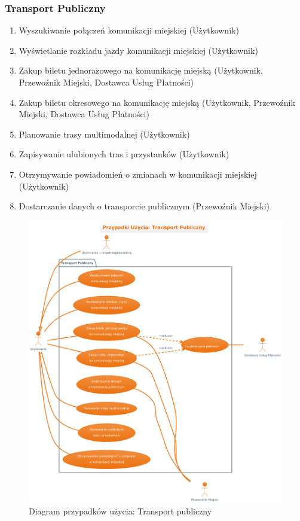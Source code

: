 \documentclass[a4paper,12pt]{article}
\begin{document}
\subsubsection{Transport Publiczny}
\begin{enumerate}[label=\arabic*.]
    \item Wyszukiwanie połączeń komunikacji miejskiej (Użytkownik)
    \item Wyświetlanie rozkładu jazdy komunikacji miejskiej (Użytkownik)
    \item Zakup biletu jednorazowego na komunikację miejską (Użytkownik, Przewoźnik Miejski, Dostawca Usług Płatności)
    \item Zakup biletu okresowego na komunikację miejską (Użytkownik, Przewoźnik Miejski, Dostawca Usług Płatności)
    \item Planowanie trasy multimodalnej (Użytkownik)
    \item Zapisywanie ulubionych tras i przystanków (Użytkownik)
    \item Otrzymywanie powiadomień o zmianach w komunikacji miejskiej (Użytkownik)
    \item Dostarczanie danych o transporcie publicznym (Przewoźnik Miejski)
\end{enumerate}
\begin{figure}[H]
    \centering
    \includegraphics[width=0.9\linewidth]{diagramy/przypadki_uzycia/images/diagram_transport_publiczny.png}
    \caption{Diagram przypadków użycia: Transport publiczny}
    \label{fig:diag_tp}
\end{figure}
\end{document}
